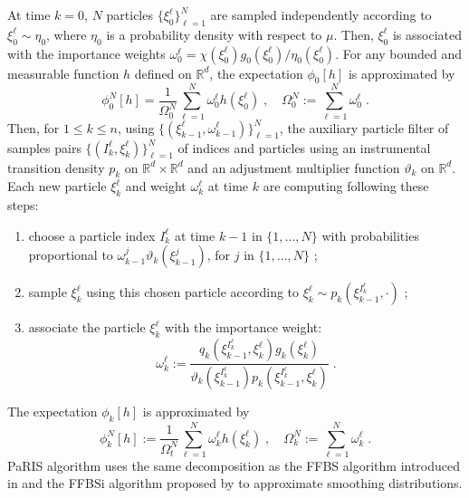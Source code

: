 \documentclass[12pt,draft]{article}
\newcommand{\eqsp}{\;}
\newcommand{\1}{\mathrm{1}}
\newcommand{\qk}{q_{k}}
\begin{document}
At time $k = 0$, $N$ particles $\{\xi^{\ell}_0\}_{\ell=1}^N$ are sampled independently according to  $\xi^{\ell}_0 \sim \eta_0$, where $\eta_0$ is a probability density with respect to $\mu$. 
Then, $\xi^{\ell}_0$ is associated with the importance weights $\omega_0^{\ell} = \chi(\xi^{\ell}_0)g_0 (\xi^{\ell}_0)/\eta_0(\xi^{\ell}_0)$. 
For any bounded and measurable function $h$ defined on $\mathbb{R}^d$, the expectation $\phi_{0}[h] $ is approximated by
\[
\phi^N_{0}[h] = \frac{1}{\Omega_0^N} \sum_{\ell=1}^N \omega_0^{\ell} h \left(\xi^{\ell}_0 \right)\eqsp, \quad \Omega_0^N:= \sum_{\ell=1}^N \omega_0^{\ell}\eqsp.
\]
Then, for $1\le k \le n$, using $\{(\xi^{\ell}_{k-1},\omega^{\ell}_{k-1})\}_{\ell=1}^N$, the auxiliary particle filter of \cite{pitt:shephard:1999} samples pairs $\{(I^{\ell}_k,\xi^{\ell}_{k})\}_{\ell=1}^N$ of indices and particles using an instrumental transition density $p_k$ on $\mathbb{R}^d\times \mathbb{R}^d$ and an adjustment multiplier function $\vartheta_k$ on $\mathbb{R}^d$. Each new particle $\xi^{\ell}_{k}$ and weight $\omega^{\ell}_k$ at time $k$ are computing following these steps:
\begin{enumerate}[-]
\item choose a particle index $I^{\ell}_k$ at time $k-1$ in $\{1,\ldots,N\}$ with probabilities proportional to $\omega_{k-1}^{j} \vartheta_k (\xi^{j}_{k-1})$, for $j$ in $\{1,\ldots,N\}$ ;
\item sample  $\xi^{\ell}_{k}$ using this chosen particle according to $\xi^{\ell}_{k} \sim p_k(\xi^{I^{\ell}_k}_{k-1},\cdot)$ ; 
\item  associate the particle $\xi^{\ell}_k$ with the importance weight:
\begin{equation}
\label{eq:importance:weights}
\omega^{\ell}_k := \frac{\qk(\xi_{k-1}^{I^{\ell}_k},\xi^{\ell}_k)g_k(\xi^{\ell}_k)}{\vartheta_k(\xi^{I^{\ell}_k}_{k-1}) p_k (\xi_{k-1}^{I^{\ell}_k},\xi^{\ell}_k)}\eqsp.
\end{equation}
\end{enumerate} 
The expectation $\phi_{k}[h]$ is approximated by
\[
\phi^N_{k}[h] := \frac{1}{\Omega_t^N} \sum_{\ell=1}^N \omega_k^{\ell} h \left(\xi^{\ell}_k \right)\eqsp,\quad\Omega_k^N:= \sum_{\ell=1}^N \omega_k^{\ell}\eqsp.
\]
PaRIS algorithm uses the same decomposition as the FFBS algorithm introduced in \cite{doucetgodsillandrieu:2000} and the FFBSi algorithm proposed by \cite{godsill:doucet:west:2004} to approximate smoothing distributions. 
\end{document}
